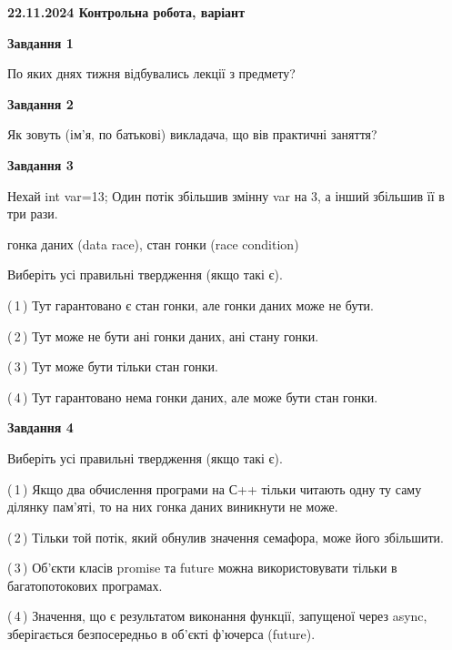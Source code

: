 \documentclass[12pt, ukrainian]{article}
\begin{document}
\begin {large}

\textbf{22.11.2024 Контрольна робота, варіант  }\par


{

\begin{center}
\textbf{Завдання 1}
\end{center}

По яких днях тижня відбувались лекції з предмету?


\begin{center}
\textbf{Завдання 2}
\end{center}

Як зовуть (ім'я, по батькові) викладача, що вів практичні заняття?


\begin{center}
\textbf{Завдання 3}
\end{center}

Нехай int var=13; Один потік збільшив змінну var на 3, а інший збільшив її в три рази.

гонка даних (data race), стан гонки (race condition)

Виберіть усі правильні твердження (якщо такі є).\par
\vspace{2mm}
(\,1\,) Тут гарантовано є стан гонки, але гонки даних може не бути.%

(\,2\,) Тут може не бути ані гонки даних, ані стану гонки.%

(\,3\,) Тут може бути тільки стан гонки.%

(\,4\,) Тут гарантовано нема гонки даних, але може бути стан гонки.%


\begin{center}
\textbf{Завдання 4}
\end{center}

Виберіть усі правильні твердження (якщо такі є).\par
\vspace{2mm}

(\,1\,) Якщо два обчислення програми на С++ тільки читають одну ту саму ділянку пам'яті, то на них гонка даних  виникнути не може.%

(\,2\,) Тільки той потік, який обнулив значення семафора, може його збільшити.%

(\,3\,) Об’єкти класів promise та future можна використовувати тільки в багатопотокових програмах.%

(\,4\,) Значення, що є результатом виконання функції, запущеної через async, зберігається безпосередньо в об’єкті ф’ючерса (future).%


}
\end{large}
\end{document}
